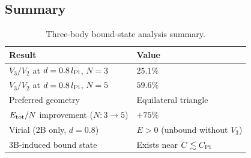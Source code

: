 \subsection{Summary}

\begin{table}[h]
\centering
\caption{Three-body bound-state analysis summary.}
\label{tab:bound_state_summary}
\begin{tabular}{ll}
\hline
Result & Value \\
\hline
$V_3/V_2$ at $d=0.8\,l_{\rm Pl}$, $N=3$ & $25.1\%$ \\
$V_3/V_2$ at $d=0.8\,l_{\rm Pl}$, $N=5$ & $59.6\%$ \\
Preferred geometry & Equilateral triangle \\
$E_{\rm tot}/N$ improvement ($N\!: 3\to 5$) & $+75\%$ \\
Virial (2B only, $d=0.8$) & $E>0$ (unbound without $V_3$) \\
3B-induced bound state & Exists near $C\lesssim C_{\rm Pl}$ \\
\hline
\end{tabular}
\end{table}

